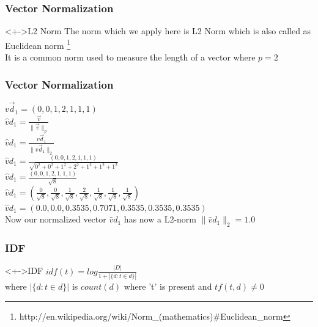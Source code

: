 \documentclass[serif,11pt,aspectratio=1610,table]{beamer}
\begin{document}
\begin{frame}[fragile]
 \frametitle{Vector Normalization}
\begin{block}<+->{L2 Norm}
 The norm which we apply here is L2 Norm which is also called as Euclidean norm \footnote{http://en.wikipedia.org/wiki/Norm\_(mathematics)\#Euclidean\_norm} \\
It is a common norm used to measure the length of a vector where $p = 2 $
\end{block}

\end{frame}

\begin{frame}[fragile]
 \frametitle{Vector Normalization}
$ v\vec d_{1} = (0, 0, 1, 2, 1, 1, 1) $ \\
$ \hat{v} d_{1} = \frac{\vec v}{\|\vec v \| _{p}} $ \\
$ \hat{v}d_{1} = \frac{v \vec d_{1}} {\|v\vec d_{1} \| _{2}} $ \\
$ \hat{v}d_{1} = \frac{(0, 0, 1, 2, 1, 1, 1)}{\sqrt{0^{2} + 0^{2} + 1^{2} + 2^{2} + 1^{2} + 1^{2} + 1^{2}}} $ \\
$ \hat{v}d_{1} = \frac{(0, 0, 1, 2, 1, 1, 1)}{\sqrt{8}} $ \\
$ \hat{v}d_{1} = (\frac{0}{\sqrt{8}},\frac{0}{\sqrt{8}},\frac{1}{\sqrt{8}},\frac{2}{\sqrt{8}},\frac{1}{\sqrt{8}},\frac{1}{\sqrt{8}},\frac{1}{\sqrt{8}}) $ \\
$ \hat{v}d_{1} = (0.0, 0.0, 0.3535, 0.7071, 0.3535, 0.3535, 0.3535)$ \\
Now our normalized vector $\hat{v}d_{1}$ has now a L2-norm $\| \hat{v}d_{1} \| _{2} = 1.0 $
\end{frame}



\begin{frame}[fragile]
 \frametitle{IDF}
\begin{block}<+->{IDF}
  $idf(t) = log \frac{|D|}{1+|\{d : t \in d\}|}$ \\
 where $  | \{d : t \in d\} | $ is    $count(d)$ where 't' is present and $tf(t,d) \ne 0$

\end{block}

\end{frame}
\end{document}
